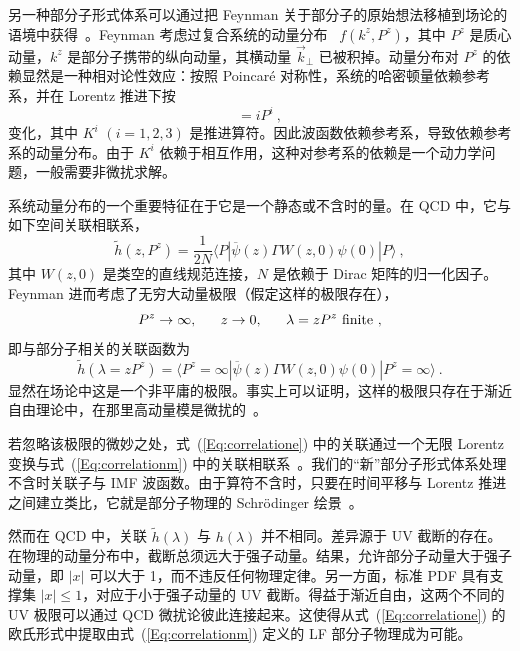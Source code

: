 另一种部分子形式体系可以通过把 Feynman 关于部分子的原始想法移植到场论的语境中获得~\cite{Ji:2014gla,Ji:2020ect}。Feynman 考虑过复合系统的动量分布~\cite{Feynman:1973xc}
$f(k^z, P^z)$，其中 $P^z$ 是质心动量，$k^z$ 是部分子携带的纵向动量，其横动量 $\vec{k}_\perp$ 已被积掉。动量分布对 $P^z$ 的依赖显然是一种相对论性效应：按照 Poincar\'e 对称性，系统的哈密顿量依赖参考系，并在 Lorentz 推进下按
\begin{equation}
  [H, K^i] = i P^i\ ,
\end{equation}
变化，其中 $K^i$ $(i = 1,2,3)$ 是推进算符。因此波函数依赖参考系，导致依赖参考系的动量分布。由于 $K^i$ 依赖于相互作用，这种对参考系的依赖是一个动力学问题，一般需要非微扰求解。

系统动量分布的一个重要特征在于它是一个静态或不含时的量。在 QCD 中，它与如下空间关联相联系，
\begin{equation}
    \tilde h(z,P^z)= \frac{1}{2N}\langle P|\overline \psi(z)\Gamma W(z, 0)\psi(0)|P\rangle \ ,
\label{eq:esme}
\end{equation}
其中 $W(z,0)$ 是类空的直线规范连接，$N$ 是依赖于 Dirac 矩阵的归一化因子。Feynman 进而考虑了无穷大动量极限（假定这样的极限存在），
\begin{equation}
  P^z \to \infty, ~~~~~z\to 0, ~~~~~\lambda = zP^z ~{\rm finite}\ ,
\end{equation}
即与部分子相关的关联函数为
\begin{equation}
  \tilde h(\lambda= zP^z) = \langle P^z=\infty|\overline \psi(z)\Gamma W(z, 0)\psi(0)|P^z=\infty\rangle\ .
\label{Eq:correlatione}
\end{equation}
显然在场论中这是一个非平庸的极限。事实上可以证明，这样的极限只存在于渐近自由理论中，在那里高动量模是微扰的~\cite{Ji:2020ect}。

若忽略该极限的微妙之处，式~(\ref{Eq:correlatione}) 中的关联通过一个无限 Lorentz 变换与式~(\ref{Eq:correlationm}) 中的关联相联系~\cite{Ji:2013dva}。我们的``新''部分子形式体系处理不含时关联子与 IMF 波函数。由于算符不含时，只要在时间平移与 Lorentz 推进之间建立类比，它就是部分子物理的 Schr\"odinger 绘景~\cite{Ji:2020ect}。

然而在 QCD 中，关联 $\tilde h(\lambda)$ 与 $h(\lambda)$ 并不相同。差异源于 UV 截断的存在。在物理的动量分布中，截断总须远大于强子动量。结果，允许部分子动量大于强子动量，即 $|x|$ 可以大于 1，而不违反任何物理定律。另一方面，标准 PDF 具有支撑集 $|x|\le1$，对应于小于强子动量的 UV 截断。得益于渐近自由，这两个不同的 UV 极限可以通过 QCD 微扰论彼此连接起来。这使得从式~(\ref{Eq:correlatione}) 的欧氏形式中提取由式~(\ref{Eq:correlationm}) 定义的 LF 部分子物理成为可能。

